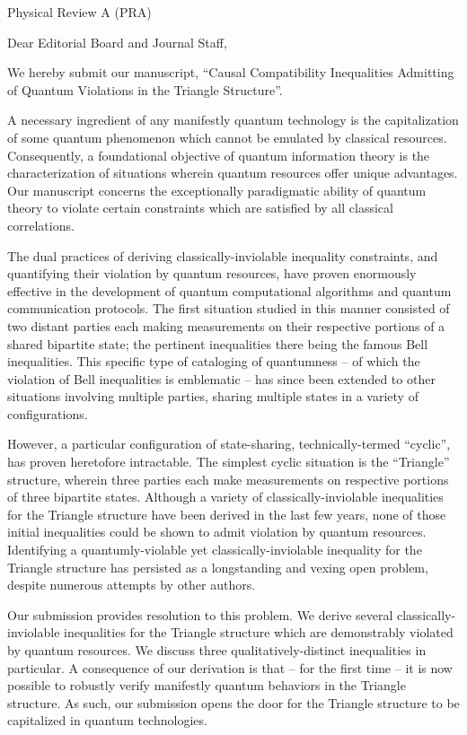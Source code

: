 \documentclass[12pt]{letter}
\begin{document}
\begin{letter}{Physical Review A (PRA)}
{\selectfont
\opening{Dear Editorial Board and Journal Staff,}

We hereby submit our manuscript, “Causal Compatibility Inequalities Admitting of Quantum Violations in the Triangle Structure”.

A necessary ingredient of any manifestly quantum technology is the capitalization of some quantum phenomenon which cannot be emulated by classical resources. Consequently, a foundational objective of quantum information theory is the characterization of situations wherein quantum resources offer unique advantages. Our manuscript concerns the exceptionally paradigmatic ability of quantum theory to violate certain constraints which are satisfied by all classical correlations.

The dual practices of deriving classically-inviolable inequality constraints, and quantifying their violation by quantum resources, have proven enormously effective in the development of quantum computational algorithms and quantum communication protocols. The first situation studied in this manner consisted of two distant parties each making measurements on their respective portions of a shared bipartite state; the pertinent inequalities there being the famous Bell inequalities. This specific type of cataloging of quantumness – of which the violation of Bell inequalities is emblematic – has since been extended to other situations involving multiple parties, sharing multiple states in a variety of configurations.

However, a particular configuration of state-sharing, technically-termed “cyclic”, has proven heretofore intractable. The simplest cyclic situation is the “Triangle” structure, wherein three parties each make measurements on respective portions of three bipartite states. Although a variety of classically-inviolable inequalities for the Triangle structure have been derived in the last few years, none of those initial inequalities could be shown to admit violation by quantum resources. Identifying a quantumly-violable yet classically-inviolable inequality for the Triangle structure has persisted as a longstanding and vexing open problem, despite numerous attempts by other authors.

Our submission provides resolution to this problem. We derive several classically-inviolable inequalities for the Triangle structure which are demonstrably violated by quantum resources. We discuss three qualitatively-distinct inequalities in particular. A consequence of our derivation is that – for the first time – it is now possible to robustly verify manifestly quantum behaviors in the Triangle structure. As such, our submission opens the door for the Triangle structure to be capitalized in quantum technologies.

}
\end{letter}
\end{document}
